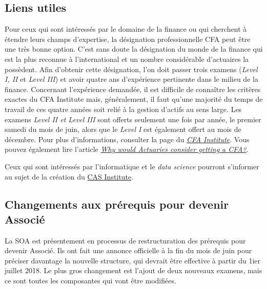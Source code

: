 \documentclass[11pt,french]{article}
\begin{document}
\subsection*{Liens utiles}
\label{subsec:liens}
Pour ceux qui sont intéressés par le domaine de la finance ou qui cherchent à étendre leurs champs d'expertise, la désignation professionnelle CFA peut être une très bonne option. C'est sans doute la désignation du monde de la finance qui est la plus reconnue à l'international et un nombre considérable d'actuaires la possèdent. Afin d'obtenir cette désignation, l'on doit passer trois examens (\emph{Level I, II} et \emph{Level III}) et avoir quatre ans d'expérience pertinente dans le milieu de la finance. Concernant l'expérience demandée, il est difficile de connaître les critères exactes du CFA Institute mais, généralement, il faut qu'une majorité du temps de travail de ces quatre années soit relié à la gestion d'actifs au sens large. Les examens \emph{Level II \emph{et} Level III} sont offerts seulement une fois par année, le premier samedi du mois de juin, alors que le \emph{Level I} est également offert au mois de décembre. Pour plus d'informations, consulter la page du \href{https://www.cfainstitute.org/Pages/index.aspx}{\emph{CFA Institute}}. Vous pouvez également lire l'article \href{http://blog.coachingactuaries.com/why-would-actuaries-consider-getting-a-cfa/}{\emph{Why would Actuaries consider getting a CFA?}}.\vspace{\baselineskip}

Ceux qui sont intéressés par l'informatique et le \emph{data science} pourront s'informer au sujet de la création du \href{http://www.casact.org/press/index.cfm?fa=viewArticle&articleID=3083}{CAS Institute}.\vspace{\baselineskip} 

\newpage
\subsection*{Changements aux prérequis pour devenir Associé}
\label{subsec:changeasa}
La SOA est présentement en processus de restructuration des prérequis pour devenir Associé. Ils ont fait une annonce officielle à la fin du mois de juin pour préciser davantage la nouvelle structure, qui devrait être effective à partir du 1ier juillet 2018. Le plus gros changement est l’ajout de deux nouveaux examens, mais ce sont toutes les composantes qui vont être modifiées.\vspace{\baselineskip} 
\end{document}
